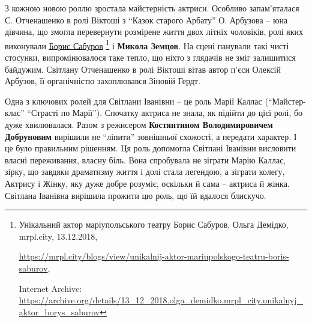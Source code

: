 З кожною новою роллю зростала майстерність актриси. Особливо запам'яталася С.
Отченашенко в ролі Віктоші з \enquote{Казок старого Арбату} О. Арбузова – юна дівчина,
що змогла перевернути розмірене життя двох літніх чоловіків, ролі яких
виконували \href{https://archive.org/details/13_12_2018.olga_demidko.mrpl_city.unikalnyj_aktor_borys_saburov}{Борис Сабуров}%
\footnote{Унікальний актор маріупольського театру Борис Сабуров, Ольга Демідко, mrpl.city, 13.12.2018, \par%
\url{https://mrpl.city/blogs/view/unikalnij-aktor-mariupolskogo-teatru-boris-saburov}, \par%
Internet Archive: \url{https://archive.org/details/13_12_2018.olga_demidko.mrpl_city.unikalnyj_aktor_borys_saburov}
} і \textbf{Микола Земцов}. На сцені панували такі чисті
стосунки, випромінювалося таке тепло, що ніхто з глядачів не зміг залишитися
байдужим. Світлану Отченашенко в ролі Віктоші вітав автор п'єси Олексій
Арбузов, її органічністю захоплювався Зіновій Гердт.


Одна з ключових ролей для Світлани Іванівни – це роль Марії Каллас
(\enquote{Майстер-клас} \enquote{Страсті по Марії}). Спочатку актриса не знала, як підійти до
цієї ролі, бо дуже хвилювалася. Разом з режисером \textbf{Костянтином Володимировичем
Добруновим} вирішили не \enquote{ліпити} зовнішньої схожості, а передати характер. І це
було правильним рішенням. Ця роль допомогла Світлані Іванівни висловити власні
переживання, власну біль. Вона спробувала не зіграти Марію Каллас, зірку, що
завдяки драматизму життя і долі стала легендою, а зіграти колегу, Актрису і
Жінку, яку дуже добре розуміє, оскільки й сама – актриса й жінка. Світлана
Іванівна вирішила прожити цю роль, що їй вдалося блискучо.


